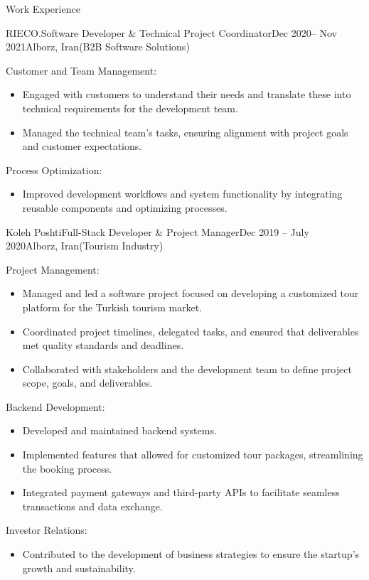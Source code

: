 \documentclass[]{kyvernitis-resume}
\begin{document}
\begin{section}{Work Experience}
\begin{subsection}{RIECO.}{Software Developer  \& Technical Project Coordinator}{Dec 2020-- Nov 2021}{Alborz, Iran}{(B2B Software Solutions)}
	\item Customer and Team Management:
		\begin{itemize}
			\item Engaged with customers to understand their needs and translate these into technical requirements for the development team.
			\item Managed the technical team’s tasks, ensuring alignment with project goals and customer expectations.
		\end{itemize}
	
	\item Process Optimization:
		\begin{itemize}
			\item Improved development workflows and system functionality by integrating reusable components and optimizing processes.
		\end{itemize}
    \end{subsection}
    
    \begin{subsection}{Koleh Poshti}{Full-Stack Developer \& Project Manager}{Dec 2019 -- July 2020}{Alborz, Iran}{(Tourism Industry)}

        	\item Project Management:
	\begin{itemize}
	\item Managed and led a software project focused on developing a customized tour platform for the Turkish tourism market.
	\item Coordinated project timelines, delegated tasks, and ensured that deliverables met quality standards and deadlines.
	\item Collaborated with stakeholders and the development team to define project scope, goals, and deliverables.
	\end{itemize}

        	\item Backend Development:
	\begin{itemize}
	\item Developed and maintained backend systems.
	\item Implemented features that allowed for customized tour packages, streamlining the booking process.
	\item Integrated payment gateways and third-party APIs to facilitate seamless transactions and data exchange.
	\end{itemize}

        	\item Investor Relations:
	\begin{itemize}
	\item Contributed to the development of business strategies to ensure the startup’s growth and sustainability.
	\end{itemize}


\end{subsection}
\end{section}
\end{document}
